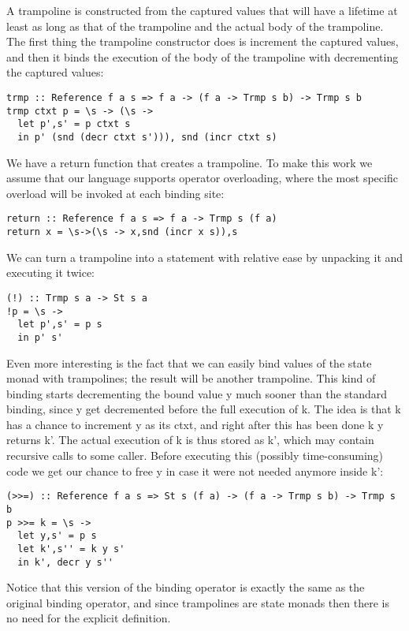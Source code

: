 A trampoline is constructed from the captured values that will have a lifetime at least as long as that of the trampoline and the actual body of the trampoline. The first thing the trampoline constructor does is increment the captured values, and then it binds the execution of the body of the trampoline with decrementing the captured values:

\begin{lstlisting}
trmp :: Reference f a s => f a -> (f a -> Trmp s b) -> Trmp s b
trmp ctxt p = \s -> (\s ->
  let p',s' = p ctxt s
  in p' (snd (decr ctxt s'))), snd (incr ctxt s)
\end{lstlisting}

We have a return function that creates a trampoline. To make this work we assume that our language supports operator overloading, where the most specific overload will be invoked at each binding site:

\begin{lstlisting}
return :: Reference f a s => f a -> Trmp s (f a)
return x = \s->(\s -> x,snd (incr x s)),s
\end{lstlisting}

We can turn a trampoline into a statement with relative ease by unpacking it and executing it twice:

\begin{lstlisting}
(!) :: Trmp s a -> St s a
!p = \s ->
  let p',s' = p s
  in p' s'
\end{lstlisting}

Even more interesting is the fact that we can easily bind values of the state monad with trampolines;  the result will be another trampoline. This kind of binding starts decrementing the bound value y much sooner than the standard binding, since y get decremented before the full execution of k. The idea is that k has a chance to increment y as its ctxt, and right after this has been done k y returns k'. The actual execution of k is thus stored as k', which may contain recursive calls to some caller. Before executing this (possibly time-consuming) code we get our chance to free y in case it were not needed anymore inside k':

\begin{lstlisting}
(>>=) :: Reference f a s => St s (f a) -> (f a -> Trmp s b) -> Trmp s b
p >>= k = \s ->
  let y,s' = p s
  let k',s'' = k y s'
  in k', decr y s''
\end{lstlisting}

Notice that this version of the binding operator is exactly the same as the original binding operator, and since trampolines are state monads then there is no need for the explicit definition.

